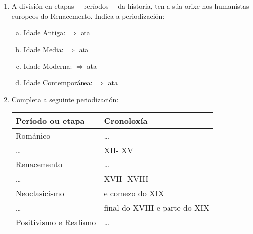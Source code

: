 \begin{ejercicio}
 \begin{enumerate}[1)]
  \item 
A división en etapas ---períodos--- da historia, ten a súa orixe nos humanistas europeos do Renacemento. Indica a periodización:

\begin{enumerate}[a)]
 \item
 Idade Antiga: \dotfill $\Rightarrow$ ata \dotfill \hspace{0.5cm}
 \item
 Idade Media: \dotfill $\Rightarrow$ ata \dotfill \hspace{0.5cm}
 \item
 Idade Moderna: \dotfill $\Rightarrow$ ata \dotfill \hspace{0.5cm}
 \item
 Idade Contemporánea: \dotfill $\Rightarrow$ ata \dotfill \hspace{0.5cm} 
\end{enumerate}
\item
Completa a seguinte periodización:
\par
\begin{center}
\begin{tabular}{ll}
Período ou etapa & Cronoloxía \\
\hline
Románico & \ldots \\
\ldots         & XII- XV \\
Renacemento & \ldots\\
\ldots & XVII- XVIII \\
Neoclasicismo & \dotfill e comezo do XIX \\
\ldots & final do XVIII e parte do XIX \\
Positivismo e Realismo & \ldots \\
\hline
\end{tabular}
\end{center}
\end{enumerate}

\end{ejercicio}
%


